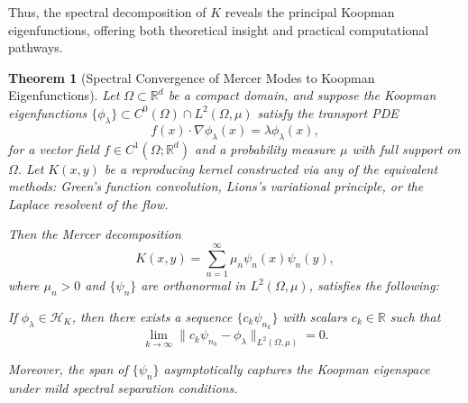 \documentclass[11pt]{article}
\theoremstyle{plain}
\newtheorem{theorem}{Theorem}[section]
\def\[{\begin{equation}}
\def\]{\end{equation}}
\begin{document}
Thus, the spectral decomposition of \(K\) reveals the principal Koopman eigenfunctions, offering both theoretical insight and practical computational pathways.

\begin{theorem}[Spectral Convergence of Mercer Modes to Koopman Eigenfunctions]
\label{thm:spectral-convergence}
Let $\Omega \subset \mathbb{R}^d$ be a compact domain, and suppose the Koopman eigenfunctions $\{\phi_\lambda\} \subset C^0(\Omega) \cap L^2(\Omega, \mu)$ satisfy the transport PDE
\[
f(x) \cdot \nabla \phi_\lambda(x) = \lambda \phi_\lambda(x),
\]
for a vector field $f \in C^1(\Omega; \mathbb{R}^d)$ and a probability measure $\mu$ with full support on $\Omega$. Let $K(x, y)$ be a reproducing kernel constructed via any of the equivalent methods: Green’s function convolution, Lions’s variational principle, or the Laplace resolvent of the flow.

Then the Mercer decomposition
\[
K(x, y) = \sum_{n=1}^\infty \mu_n \psi_n(x) \psi_n(y),
\]
where $\mu_n > 0$ and $\{\psi_n\}$ are orthonormal in $L^2(\Omega, \mu)$, satisfies the following:

If $\phi_\lambda \in \mathcal{H}_K$, then there exists a sequence $\{c_k \psi_{n_k}\}$ with scalars $c_k \in \mathbb{R}$ such that
\[
\lim_{k \to \infty} \| c_k \psi_{n_k} - \phi_\lambda \|_{L^2(\Omega, \mu)} = 0.
\]

Moreover, the span of $\{ \psi_n \}$ asymptotically captures the Koopman eigenspace under mild spectral separation conditions.
\end{theorem}
\end{document}
